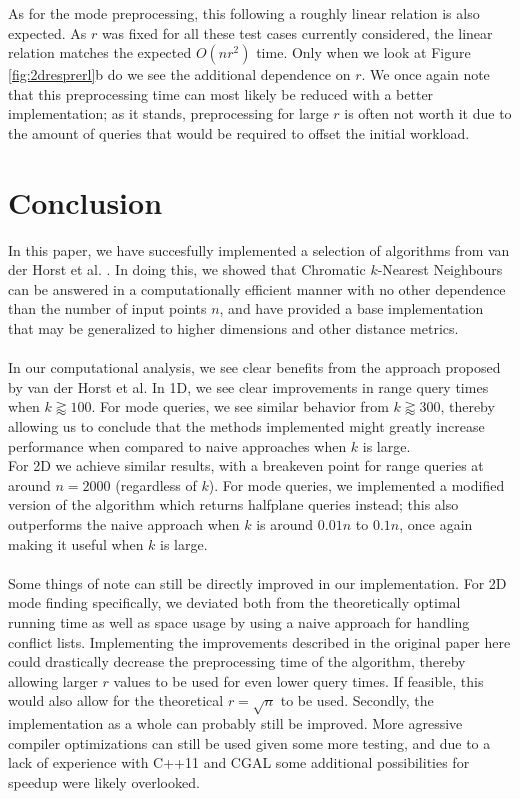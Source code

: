 \documentclass{article}
\newcommand{\fb}[1]{{#1}}
\begin{document}
{As for the mode preprocessing, this following a roughly linear relation is also expected. As $r$ was fixed for all these test cases currently considered, the linear relation matches the expected \fb{$O(nr^2)$} time. Only when we look at Figure \ref{fig:2dresprerl}b do we see the additional dependence on $r$. We once again note that this preprocessing time can most likely be reduced with a better implementation; as it stands, preprocessing for large $r$ is often not worth it due to the amount of queries that would be required to offset the initial workload.}
\section{Conclusion}
\fb{
    In this paper, we have succesfully implemented a selection of algorithms from van der Horst et al. \cite{vanderhorst_et_al:LIPIcs.ESA.2022.67}. In doing this, we showed that Chromatic $k$-Nearest Neighbours can be answered in a computationally efficient manner with no other dependence than the number of input points $n$, and have provided a base implementation that may be generalized to higher dimensions and other distance metrics. \\\\
    In our computational analysis, we see clear benefits from the approach proposed by van der Horst et al. In 1D, we see clear improvements in range query times when $k \gtrapprox 100$. For mode queries, we see similar behavior from $k \gtrapprox 300$, thereby allowing us to conclude that the methods implemented might greatly increase performance when compared to naive approaches when $k$ is large. \\
    For 2D we achieve similar results, with a breakeven point for range queries at around $n=2000$ (regardless of $k$). For mode queries, we implemented a modified version of the algorithm which returns halfplane queries instead; this also outperforms the naive approach when $k$ is around $0.01n$ to $0.1n$, once again making it useful when $k$ is large. \\\\
    Some things of note can still be directly improved in our implementation. For 2D mode finding specifically, we deviated both from the theoretically optimal running time as well as space usage by using a naive approach for handling conflict lists. Implementing the improvements described in the original paper here could drastically decrease the preprocessing time of the algorithm, thereby allowing larger $r$ values to be used for even lower query times. If feasible, this would also allow for the theoretical $r=\sqrt{n}$ to be used. Secondly, the implementation as a whole can probably still be improved. More agressive compiler optimizations can still be used given some more testing, and due to a lack of experience with C++11 and CGAL some additional possibilities for speedup were likely overlooked. \\\\
}
\end{document}
